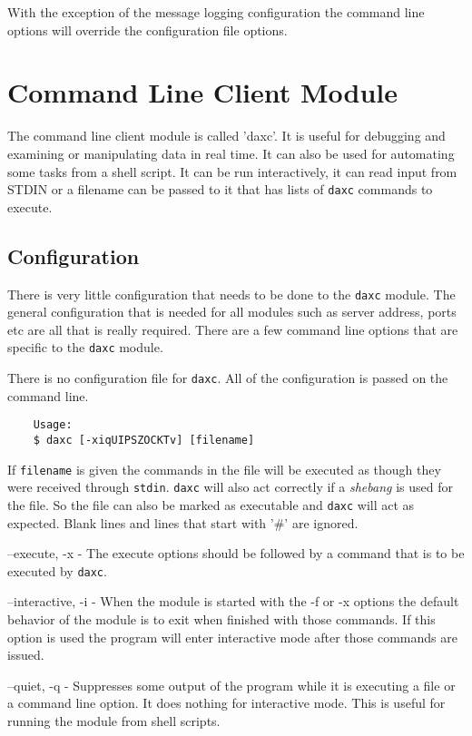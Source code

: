 	With the exception of the message logging configuration the command line options
	will override the configuration file options.

	\chapter{Command Line Client Module}
	The command line client module is called 'daxc'.  It is useful for debugging and
	examining or manipulating \opendax{} data in real time.  It can also be used for
	automating some \opendax{} tasks from a shell script.  It can be run interactively,
	it can read input from STDIN or a filename can be passed to it that has lists of
	\texttt{daxc} commands to execute.

	\section{Configuration}
	There is very little configuration that needs to be done to the \texttt{daxc}
	module.  The general configuration that is needed for all modules such as server
	address, ports etc are all that is really required.  There are a few command
	line options that are specific to the \texttt{daxc} module.

	There is no configuration file for \texttt{daxc}.  All of the configuration is
	passed on the command line.

	\begin{verbatim}
	Usage:
	$ daxc [-xiqUIPSZOCKTv] [filename]
	\end{verbatim}

	If \texttt{filename} is given the commands in the file will be executed as
	though
	they were received through \texttt{stdin}.  \texttt{daxc} will also act
	correctly if a \textit{shebang} is used for the file.  So the file can also be
	marked as executable and \texttt{daxc} will act as expected.  Blank lines and
	lines that start with '\#' are ignored.

	\begin{list}{}{daxc Command Line Options}
		\item[--execute, -x] - The execute options should be followed by a command
		that is to be executed by \texttt{daxc}.
		\item[--interactive, -i] - When the module is started with the -f or -x
		options the default behavior of the module is to exit when finished with those
		commands.  If this option is used the program will enter interactive mode after
		those commands are issued.
		\item[--quiet, -q] - Suppresses some output of the program while it is
		executing a file or a command line option.  It does nothing for interactive
		mode.  This is useful for running the module from shell scripts.
	\end{list}

